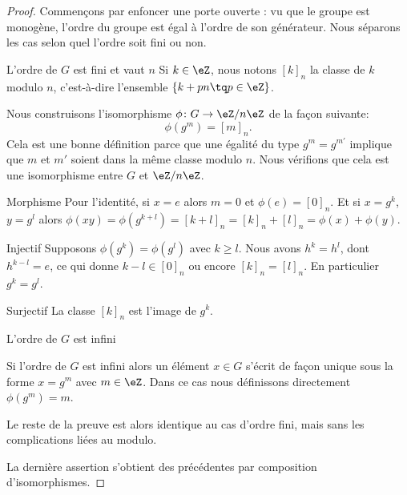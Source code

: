 \begin{proof}

    Commençons par enfoncer une porte ouverte : vu que le groupe est monogène, l'ordre du groupe est égal à l'ordre de son générateur. Nous séparons les cas selon quel l'ordre soit fini ou non.

    \begin{subproof}
        \item[L'ordre de \( G\) est fini et vaut \( n\)]
            Si \( k\in\eZ\), nous notons \( [k]_n\) la classe de \( k\) modulo \( n\), c'est-à-dire l'ensemble \( \{ k+pn\tq p\in \eZ \}\).

            Nous construisons l'isomorphisme \( \phi\colon G\to \eZ/n\eZ\) de la façon suivante:
            \begin{equation}
                \phi(g^m)=[m]_n.
            \end{equation}
            Cela est une bonne définition parce que une égalité du type \( g^m=g^{m'}\) implique que \( m\) et \( m'\) soient dans la même classe modulo \( n\). Nous vérifions que cela est une isomorphisme entre \( G\) et \( \eZ/n\eZ\).

            \begin{subproof}
            \item[Morphisme]
                Pour l'identité, si \( x=e\) alors \( m=0\) et \( \phi(e)=[0]_n\). Et si \( x=g^k\), \( y=g^l\) alors \( \phi(xy)=\phi(g^{k+l})=[k+l]_n=[k]_n+[l]_n=\phi(x)+\phi(y) \).
            \item[Injectif]
                Supposons \( \phi(g^k)=\phi(g^l)\) avec \( k\geq l\). Nous avons \( h^k=h^l\), dont \( h^{k-l}=e\), ce qui donne \( k-l\in [0]_n\) ou encore \( [k]_n=[l]_n\). En particulier \( g^k=g^l\).
            \item[Surjectif]
                La classe \( [k]_n\) est l'image de \( g^k\).
            \end{subproof}

        \item[L'ordre de \( G\) est infini]

                Si l'ordre de \( G\) est infini alors un élément \( x\in G\) s'écrit de façon unique sous la forme \( x=g^m\) avec \( m\in \eZ\). Dans ce cas nous définissons directement \( \phi(g^m)=m\).

                Le reste de la preuve est alors identique au cas d'ordre fini, mais sans les complications liées au modulo.

    \end{subproof}

    La dernière assertion s'obtient des précédentes par composition d'isomorphismes.

\end{proof}

